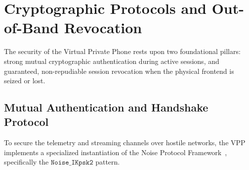 \section{Cryptographic Protocols and Out-of-Band Revocation}
\label{sec:crypto}

The security of the Virtual Private Phone rests upon two foundational pillars: strong mutual cryptographic authentication during active sessions, and guaranteed, non-repudiable session revocation when the physical frontend is seized or lost.

\subsection{Mutual Authentication and Handshake Protocol}
To secure the telemetry and streaming channels over hostile networks, the VPP implements a specialized instantiation of the Noise Protocol Framework~\cite{perrin2018noise}, specifically the $\texttt{Noise\_IKpsk2}$ pattern. 

